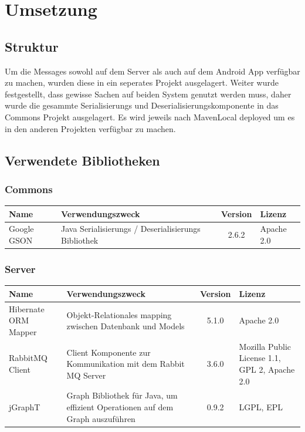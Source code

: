 \newpage
\chapter{Umsetzung}

\section{Struktur}
Um die Messages sowohl auf dem Server als auch auf dem Android App verfügbar zu machen, wurden diese in ein seperates Projekt ausgelagert. Weiter wurde festgestellt, dass gewisse Sachen auf beiden System genutzt werden muss, daher wurde die gesammte Serialisierungs und Deserialisierungskomponente in das Commons Projekt ausgelagert. Es wird jeweils nach MavenLocal deployed um es in den anderen Projekten verfügbar zu machen.


\section{Verwendete Bibliotheken}
\subsection{Commons}
\begin{tabularx}{\textwidth}{|X|X|c|X|}
	\hline
	\textbf{Name} & \textbf{Verwendungszweck} & \textbf{Version} & \textbf{Lizenz} \\
	\hline \hline
	Google GSON & Java Serialisierungs / Deserialisierungs Bibliothek & 2.6.2 & Apache 2.0\\
	\hline 
\end{tabularx}


\subsection{Server}
\begin{tabularx}{\textwidth}{|X|X|c|X|}
	\hline
	\textbf{Name} & \textbf{Verwendungszweck} & \textbf{Version} & \textbf{Lizenz} \\
	\hline \hline
	Hibernate ORM Mapper & Objekt-Relationales mapping zwischen Datenbank und Models  & 5.1.0 & Apache 2.0\\
	\hline 
	RabbitMQ Client & Client Komponente zur Kommunikation mit dem Rabbit MQ Server & 3.6.0 &  Mozilla Public License 1.1, GPL 2, Apache 2.0 \\
	\hline 
	jGraphT & Graph Bibliothek für Java, um effizient Operationen auf dem Graph auszuführen & 0.9.2 &  LGPL, EPL \\
	\hline 
\end{tabularx}

